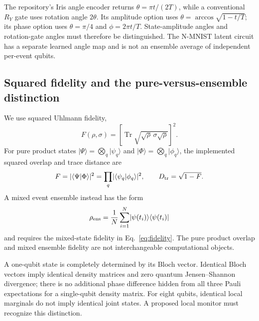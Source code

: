 \documentclass[10pt,onecolumn]{article}
\begin{document}
The repository's Iris angle encoder returns $\theta=\pi t/(2T)$, while a conventional $R_Y$ gate uses rotation angle $2\theta$. Its amplitude option uses $\theta=\arccos\sqrt{1-t/T}$; its phase option uses $\theta=\pi/4$ and $\phi=2\pi t/T$. State-amplitude angles and rotation-gate angles must therefore be distinguished. The N-MNIST latent circuit has a separate learned angle map and is not an ensemble average of independent per-event qubits.

\subsection{Squared fidelity and the pure-versus-ensemble distinction}
We use squared Uhlmann fidelity,
\begin{equation}
F(\rho,\sigma)=\left[\operatorname{Tr}\sqrt{\sqrt\rho\,\sigma\sqrt\rho}\right]^2.
\label{eq:fidelity}
\end{equation}
For pure product states $\lvert\Psi\rangle=\bigotimes_q\lvert\psi_q\rangle$ and $\lvert\Phi\rangle=\bigotimes_q\lvert\phi_q\rangle$, the implemented squared overlap and trace distance are
\begin{equation}
F=\lvert\langle\Psi\vert\Phi\rangle\rvert^2
 =\prod_q\lvert\langle\psi_q\vert\phi_q\rangle\rvert^2,
\qquad D_{\rm tr}=\sqrt{1-F}.
\label{eq:product}
\end{equation}
A mixed event ensemble instead has the form
\begin{equation}
\rho_{\rm ens}=\frac1N\sum_{i=1}^{N}
\lvert\psi(t_i)\rangle\langle\psi(t_i)\rvert
\label{eq:ensemble}
\end{equation}
and requires the mixed-state fidelity in Eq.~\eqref{eq:fidelity}. The pure product overlap and mixed ensemble fidelity are not interchangeable computational objects.

A one-qubit state is completely determined by its Bloch vector. Identical Bloch vectors imply identical density matrices and zero quantum Jensen--Shannon divergence; there is no additional phase difference hidden from all three Pauli expectations for a single-qubit density matrix. For eight qubits, identical local marginals do not imply identical joint states. A proposed local monitor must recognize this distinction.
\end{document}
